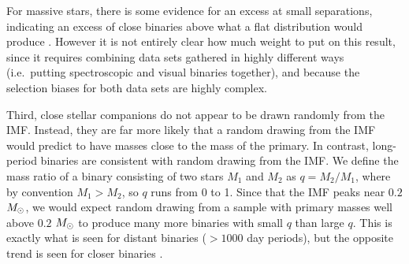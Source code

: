 For massive stars, there is some evidence for an excess at small separations, indicating an excess of close binaries above what a flat distribution would produce \citep{sana11a}. However it is not entirely clear how much weight to put on this result, since it requires combining data sets gathered in highly different ways (i.e.\ putting spectroscopic and visual binaries together), and because the selection biases for both data sets are highly complex.

Third, close stellar companions do not appear to be drawn randomly from the IMF. Instead, they are far more likely that a random drawing from the IMF would predict to have masses close to the mass of the primary. In contrast, long-period binaries are consistent with random drawing from the IMF.  We define the mass ratio of a binary consisting of two stars $M_1$ and $M_2$ as $q=M_2/M_1$, where by convention $M_1 > M_2$, so $q$ runs from 0 to 1. Since that the IMF peaks near $0.2$ $M_{\odot}$, we would expect random drawing from a sample with primary masses well above $0.2$ $M_{\odot}$ to produce many more binaries with small $q$ than large $q$. This is exactly what is seen for distant binaries ($>1000$ day periods), but the opposite trend is seen for closer binaries \citep{mazeh92a, sana11a}.

